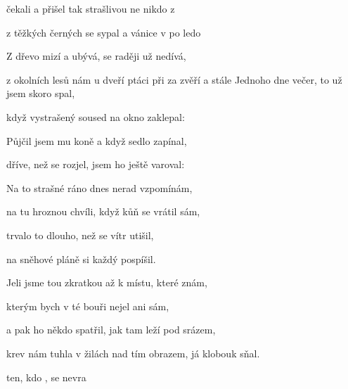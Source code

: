 
\zs
{} čekali  a  přišel 
tak strašlivou  ne nikdo z 

z těžkých černých  se  sypal 
a vánice  v po ledo

Z  dřevo mizí a  ubývá,
 se raději už  nedívá,

 z okolních lesů nám  u dveří
 ptáci při za zvěří a stále 
\ks
\zs
Jednoho dne večer, to už jsem skoro spal,

když vystrašený soused na okno zaklepal:


Půjčil jsem mu koně a když sedlo zapínal,

dříve, než se rozjel, jsem ho ještě varoval:

\ks
\zs
Na to strašné ráno dnes nerad vzpomínám,

na tu hroznou chvíli, když kůň se vrátil sám,

trvalo to dlouho, než se vítr utišil,

na sněhové pláně si každý pospíšil.

Jeli jsme tou zkratkou až k místu, které znám,

kterým bych v té bouři nejel ani sám,

a pak ho někdo spatřil, jak tam leží pod srázem,

krev nám tuhla v žilách nad tím obrazem, já klobouk sňal.
\ks

 ten, kdo , se  nevra
\kp





